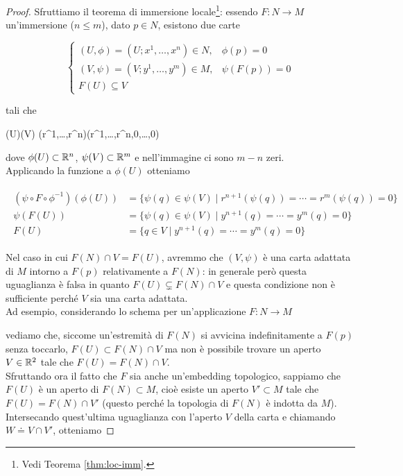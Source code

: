\begin{proof}
	Sfruttiamo il teorema di immersione locale\footnote{%
		Vedi Teorema \ref{thm:loc-imm}.%
	}: essendo $ F : N \to M $ un'immersione ($ n \leqslant m $), dato $ p \in N $, esistono due carte
	
	\begin{equation}
		\begin{cases}
			(U,\phi) = (U; x^{1},\dots,x^{n}) \in N, & \phi(p) = 0 \\
			(V,\psi) = (V; y^{1},\dots,y^{m}) \in M, & \psi(F(p)) = 0 \\
			F(U) \subseteq V
		\end{cases}
	\end{equation}
	
	tali che
	
		{\phi(U)}{\psi(V)}
		{(r^{1},\dots,r^{n})}{(r^{1},\dots,r^{n},0,\dots,0)}

	dove $ \phi(U) \subset \mathbb{R}^{n} $, $ \psi(V) \subset \mathbb{R}^{m} $ e nell'immagine ci sono $ m-n $ zeri.\\
	Applicando la funzione a $ \phi(U) $ otteniamo
	
	\begin{align}
		\begin{split}
			(\psi \circ F \circ \phi^{-1})(\phi(U)) &= \{ \psi(q) \in \psi(V) \mid r^{n+1}(\psi(q)) = \cdots = r^{m}(\psi(q)) = 0 \}\\
			\psi(F(U)) &= \{ \psi(q) \in \psi(V) \mid y^{n+1}(q) = \cdots = y^{m}(q) = 0 \}\\
			F(U) &= \{ q \in V \mid y^{n+1}(q) = \cdots = y^{m}(q) = 0 \}
		\end{split}
	\end{align}

	Nel caso in cui $ F(N) \cap V = F(U) $, avremmo che $ (V,\psi) $ è una carta adattata di $ M $ intorno a $ F(p) $ relativamente a $ F(N) $: in generale però questa uguaglianza è falsa in quanto $ F(U) \subsetneq F(N) \cap V $ e questa condizione non è sufficiente perché $ V $ sia una carta adattata.\\
	Ad esempio, considerando lo schema per un'applicazione $ F : N \to M $
	
	
	vediamo che, siccome un'estremità di $ F(N) $ si avvicina indefinitamente a $ F(p) $ senza toccarlo, $ F(U) \subset F(N) \cap V $ ma non è possibile trovare un aperto $ V \in \mathbb{R}^{2} $ tale che $ F(U) = F(N) \cap V $.\\
	Sfruttando ora il fatto che $ F $ sia anche un'embedding topologico, sappiamo che $ F(U) $ è un aperto di $ F(N) \subset M $, cioè esiste un aperto $ V' \subset M $ tale che $ F(U) = F(N) \cap V' $ (questo perché la topologia di $ F(N) $ è indotta da $ M $). Intersecando quest'ultima uguaglianza con l'aperto $ V $ della carta e chiamando $ W \doteq V \cap V' $, otteniamo
	

\end{proof}
